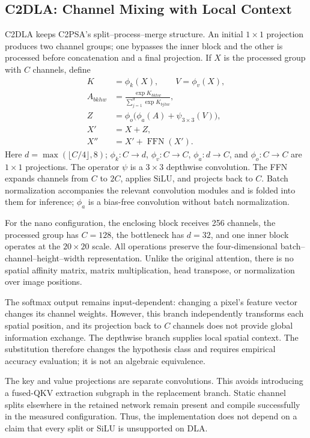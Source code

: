 \subsection{C2DLA: Channel Mixing with Local Context}
\label{sec:c2dla}

C2DLA keeps C2PSA's split--process--merge structure. An initial $1\times1$
projection produces two channel groups; one bypasses the inner block and the
other is processed before concatenation and a final projection. If $X$ is the
processed group with $C$ channels, define
\begin{align}
 K &= \phi_k(X), \qquad V=\phi_v(X), \label{eq:kv}\\
 A_{bkhw} &= \frac{\exp K_{bkhw}}{\sum_{j=1}^{d}\exp K_{bjhw}},
 \label{eq:chansoftmax}\\
 Z &= \phi_o\bigl(\phi_a(A)+\psi_{3\times3}(V)\bigr),
 \label{eq:mix}\\
 X' &= X+Z, \label{eq:res1}\\
 X'' &= X'+\operatorname{FFN}(X'). \label{eq:res2}
\end{align}
Here $d=\max(\lfloor C/4\rfloor,8)$; $\phi_k:C\to d$,
$\phi_v:C\to C$, $\phi_a:d\to C$, and $\phi_o:C\to C$ are
$1\times1$ projections. The operator $\psi$ is a $3\times3$ depthwise
convolution. The FFN expands channels from $C$ to $2C$, applies SiLU, and
projects back to $C$. Batch normalization accompanies the relevant convolution
modules and is folded into them for inference; $\phi_a$ is a bias-free
convolution without batch normalization.

For the nano configuration, the enclosing block receives 256 channels, the
processed group has $C=128$, the bottleneck has $d=32$, and one inner block
operates at the $20\times20$ scale. All operations preserve the four-dimensional
batch--channel--height--width representation. Unlike the original attention,
there is no spatial affinity matrix, matrix multiplication, head transpose,
or normalization over image positions.

The softmax output remains input-dependent: changing a pixel's feature vector
changes its channel weights. However, this branch independently transforms
each spatial position, and its projection back to $C$ channels does not provide
global information exchange. The depthwise branch supplies local spatial
context. The substitution therefore changes the hypothesis class and requires
empirical accuracy evaluation; it is not an algebraic equivalence.

The key and value projections are separate convolutions. This avoids introducing
a fused-QKV extraction subgraph in the replacement branch. Static channel
splits elsewhere in the retained network remain present and compile successfully
in the measured configuration. Thus, the implementation does not depend on a
claim that every split or SiLU is unsupported on DLA.

